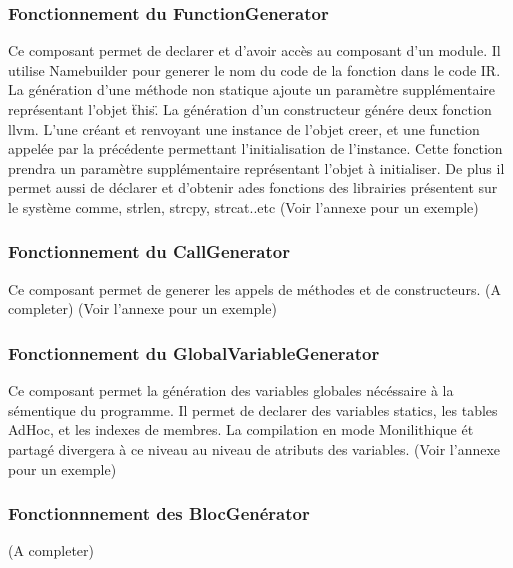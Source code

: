 \documentclass{report}
\begin{document}
   \subsubsection{Fonctionnement du FunctionGenerator}
   Ce composant permet de declarer et d'avoir accès au composant d'un module. Il utilise Namebuilder pour generer le nom du code de la fonction dans le code IR. La génération d'une méthode non statique ajoute un paramètre supplémentaire représentant l'objet \"this\". La génération d'un constructeur génére deux fonction llvm. L'une créant et renvoyant une instance de l'objet creer, et une function appelée par la précédente permettant l'initialisation de l'instance. Cette fonction prendra un paramètre supplémentaire représentant l'objet à initialiser.
   De plus il permet aussi de déclarer et d'obtenir ades fonctions des librairies présentent sur le système comme, strlen, strcpy, strcat..etc
   \small{(Voir l'annexe pour un exemple)}

   \subsubsection{Fonctionnement du CallGenerator}
   Ce composant permet de generer les appels de méthodes et de constructeurs. (A completer)
   \small{(Voir l'annexe pour un exemple)}

   \subsubsection{Fonctionnement du GlobalVariableGenerator}
   Ce composant permet la génération des variables globales nécéssaire à la sémentique du programme.
   Il permet de declarer des variables statics, les tables AdHoc, et les indexes de membres. La compilation en mode Monilithique ét partagé divergera à ce niveau au niveau de atributs des variables.
   \small{(Voir l'annexe pour un exemple)}

   \subsubsection{Fonctionnnement des BlocGenérator}
   (A completer)

    
\end{document}
